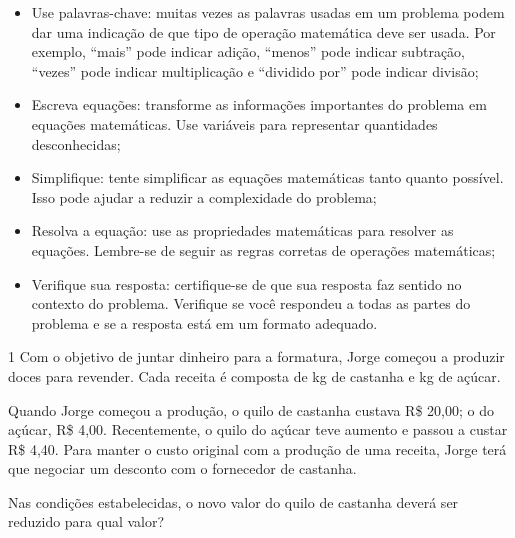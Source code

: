 \begin{escolha}
{{{\begin{itemize}
  \item Use palavras-chave: muitas vezes as palavras usadas em um
problema podem dar uma indicação de que tipo de operação matemática deve
ser usada. Por exemplo, ``mais'' pode indicar adição, ``menos'' pode
indicar subtração, ``vezes'' pode indicar multiplicação e
``dividido por'' pode indicar divisão;

  \item Escreva equações: transforme as informações importantes do
problema em equações matemáticas. Use variáveis para representar
quantidades desconhecidas;

  \item Simplifique: tente simplificar as equações matemáticas tanto
quanto possível. Isso pode ajudar a reduzir a complexidade do problema;

  \item Resolva a equação: use as propriedades matemáticas para resolver
as equações. Lembre-se de seguir as regras corretas de operações
matemáticas;

  \item Verifique sua resposta: certifique-se de que sua resposta faz
sentido no contexto do problema. Verifique se você respondeu a todas as
partes do problema e se a resposta está em um formato adequado.
\end{itemize}
}


\num{1} Com o objetivo de juntar dinheiro para a formatura, Jorge começou a
produzir doces para revender. Cada receita é composta de  kg de 
castanha e  kg de açúcar.

Quando Jorge começou a produção, o quilo de castanha custava R\$ 20,00; o do
açúcar, R\$ 4,00. Recentemente, o quilo do açúcar teve aumento e passou a
custar R\$ 4,40. Para manter o custo original com a produção de uma receita, 
Jorge terá que negociar um desconto com o fornecedor de castanha.

Nas condições estabelecidas, o novo valor do quilo de castanha deverá ser
reduzido para qual valor?

}}
\end{escolha}
